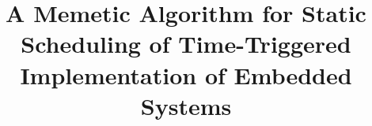 \documentclass[journal]{IEEEtran}
\theoremstyle{remark}
\begin{document}
%
\title{A Memetic Algorithm for Static Scheduling of Time-Triggered Implementation of Embedded Systems}



\author{
}



%




% 
\end{document}
